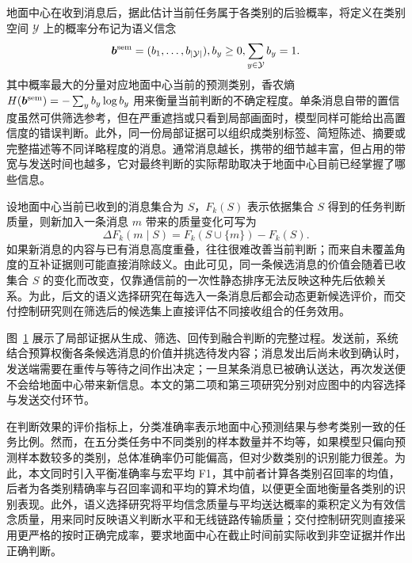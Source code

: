 地面中心在收到消息后，据此估计当前任务属于各类别的后验概率，将定义在类别空间 $\mathcal Y$ 上的概率分布记为语义信念
\begin{equation}
\bm b^{\rm sem}=(b_1,\ldots,b_{|\mathcal Y|}),
b_y\ge0, \sum_{y\in\mathcal Y}b_y=1.
\label{eq:base:semantic-belief}
\end{equation}
其中概率最大的分量对应地面中心当前的预测类别，香农熵 $H(\bm b^{\rm sem})=-\sum_yb_y\log b_y$ 用来衡量当前判断的不确定程度。单条消息自带的置信度虽然可供筛选参考，但在严重遮挡或只看到局部画面时，模型同样可能给出高置信度的错误判断。此外，同一份局部证据可以组织成类别标签、简短陈述、摘要或完整描述等不同详略程度的消息。通常消息越长，携带的细节越丰富，但占用的带宽与发送时间也越多，它对最终判断的实际帮助取决于地面中心目前已经掌握了哪些信息。

设地面中心当前已收到的消息集合为 $S$，$F_k(S)$ 表示依据集合 $S$ 得到的任务判断质量，则新加入一条消息 $m$ 带来的质量变化可写为
\begin{equation}
\Delta F_k(m\mid S)=F_k(S\cup\{m\})-F_k(S).
\label{eq:base:marginal}
\end{equation}
如果新消息的内容与已有消息高度重叠，往往很难改善当前判断；而来自未覆盖角度的互补证据则可能直接消除歧义。由此可见，同一条候选消息的价值会随着已收集合 $S$ 的变化而改变，仅靠通信前的一次性静态排序无法反映这种先后依赖关系。为此，后文的语义选择研究在每选入一条消息后都会动态更新候选评价，而交付控制研究则在筛选后的候选集上直接评估不同接收组合的任务效用。

\begin{figure}[htbp]
\centering

\label{fig:base:semantic-pipeline}
\end{figure}

图~\ref{fig:base:semantic-pipeline} 展示了局部证据从生成、筛选、回传到融合判断的完整过程。发送前，系统结合预算权衡各条候选消息的价值并挑选待发内容；消息发出后尚未收到确认时，发送端需要在重传与等待之间作出决定；一旦某条消息已被确认送达，再次发送便不会给地面中心带来新信息。本文的第二项和第三项研究分别对应图中的内容选择与发送交付环节。

在判断效果的评价指标上，分类准确率表示地面中心预测结果与参考类别一致的任务比例。然而，在五分类任务中不同类别的样本数量并不均等，如果模型只偏向预测样本数较多的类别，总体准确率仍可能偏高，但对少数类别的识别能力很差。为此，本文同时引入平衡准确率与宏平均 F1，其中前者计算各类别召回率的均值，后者为各类别精确率与召回率调和平均的算术均值，以便更全面地衡量各类别的识别表现。此外，语义选择研究将平均信念质量与平均送达概率的乘积定义为有效信念质量，用来同时反映语义判断水平和无线链路传输质量；交付控制研究则直接采用更严格的按时正确完成率，要求地面中心在截止时间前实际收到非空证据并作出正确判断。

